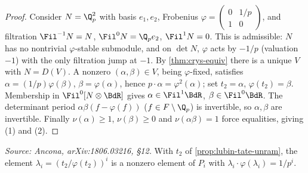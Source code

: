 \begin{proof}
  Consider \(N = \Q_p^2\) with basis \(e_1, e_2\), Frobenius
  \(\varphi = \left(\begin{smallmatrix} 0 & 1/p \\ 1 & 0 \end{smallmatrix}\right)\),
  and filtration \(\Fil^{-1} N = N\), \(\Fil^0 N = \Q_p e_2\), \(\Fil^1 N = 0\).
  This is admissible: \(N\) has no nontrivial \(\varphi\)-stable submodule, and on
  \(\det N\), \(\varphi\) acts by \(-1/p\) (valuation \(-1\)) with the only
  filtration jump at \(-1\). By \cref{thm:crys-equiv} there is a unique \(V\) with
  \(N = D(V)\). A nonzero \((\alpha, \beta) \in V\), being \(\varphi\)-fixed,
  satisfies \(\alpha = (1/p)\varphi(\beta)\), \(\beta = \varphi(\alpha)\), hence
  \(p \cdot \alpha = \varphi^2(\alpha)\); set \(t_2 = \alpha\),
  \(\varphi(t_2) = \beta\). Membership in \(\Fil^0[N \otimes \BdR]\) gives
  \(\alpha \in \Fil^1 \BdR\), \(\beta \in \Fil^0 \BdR\). The determinant period
  \(\alpha\beta(f - \varphi(f))\) (\(f \in F \setminus \Q_p\)) is invertible, so
  \(\alpha, \beta\) are invertible. Finally \(\nu(\alpha) \geq 1\),
  \(\nu(\beta) \geq 0\) and \(\nu(\alpha\beta) = 1\) force equalities, giving (1)
  and (2).
\end{proof}

\begin{corollary}
  \label{cor:period-unram}
  \textit{Source: Ancona, arXiv:1806.03216, \S12.}
  With \(t_2\) of \cref{prop:lubin-tate-unram}, the element
  \(\lambda_i = (t_2/\varphi(t_2))^i\) is a nonzero element of \(P_i\) with
  \(\lambda_i \cdot \varphi(\lambda_i) = 1/p^i\).
\end{corollary}

